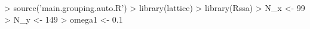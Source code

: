\begin{CodeChunk}
\begin{CodeInput}


> source('main.grouping.auto.R')
> library(lattice)
> library(Rssa)
> N_x <- 99
> N_y <- 149
> omega1 <- 0.1
\end{CodeInput}

\end{CodeChunk}